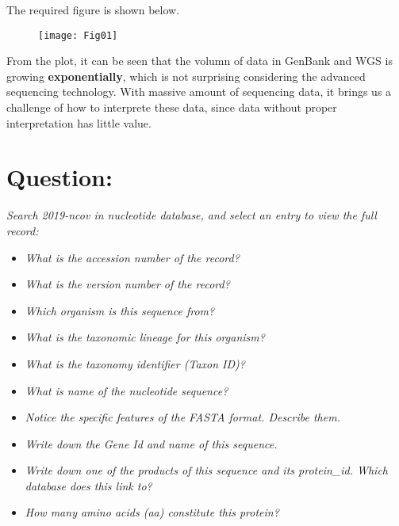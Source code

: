 \documentclass[en,black,12pt,normal]{elegantnote}
\begin{document}
The required figure is shown below.
\begin{figure}[H]
    \centering
    \texttt{[image: Fig01]}
    \caption{}
    \label{F-01}
\end{figure}

From the plot, it can be seen that the volumn of data in GenBank and WGS is growing \textbf{exponentially}, 
which is not surprising considering the advanced sequencing technology.
With massive amount of sequencing data, it brings us a challenge of how to interprete these data,
since data without proper interpretation has little value.

\section{Question:}
\textit{Search 2019-ncov in nucleotide database, and select an entry to view the full record:}
\begin{itemize}
    \item \textit{What is the accession number of the record?}
    \item \textit{What is the version number of the record?}
    \item \textit{Which organism is this sequence from?}
    \item \textit{What is the taxonomic lineage for this organism?}
    \item \textit{What is the taxonomy identifier (Taxon ID)?}
    \item \textit{What is name of the nucleotide sequence?}
    \item \textit{Notice the specific features of the FASTA format. Describe them.}
    \item \textit{Write down the Gene Id and name of this sequence.}
    \item \textit{Write down one of the products of this sequence and its protein\_id. Which database does this link to?}
    \item \textit{How many amino acids (aa) constitute this protein?}
\end{itemize}
\end{document}
